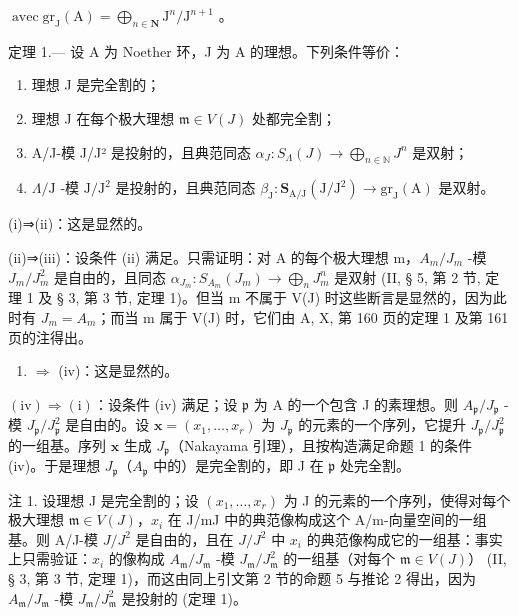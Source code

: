 \(\operatorname{avec} \mathrm{gr}_{\mathrm{J}}(\mathrm{A}) = \bigoplus_{n \in \mathbf{N}} \mathrm{J}^n / \mathrm{J}^{n+1}\) 。

定理 1.--- 设 A 为 Noether 环，J 为 A 的理想。下列条件等价：

\begin{enumerate}
\def\labelenumi{(\roman{enumi})}
\item
  理想 J 是完全割的；
\item
  理想 J 在每个极大理想 \(\mathfrak{m} \in V(J)\) 处都完全割；
\item
  A/J-模 J/J² 是投射的，且典范同态 \(\alpha_{J}: S_{\Lambda}(J) \longrightarrow \bigoplus_{n \in \mathbb{N}} J^{n}\) 是双射；
\item
  \(\Lambda/\mathrm{J}\) -模 \(\mathrm{J}/\mathrm{J}^2\) 是投射的，且典范同态 \(\beta_{\mathrm{J}}:\mathbf{S}_{\mathrm{A}/\mathrm{J}}(\mathrm{J}/\mathrm{J}^2)\longrightarrow\mathrm{gr}_{\mathrm{J}}(\mathrm{A})\) 是双射。
\end{enumerate}

(i)⇒(ii)：这是显然的。

(ii)⇒(iii)：设条件 (ii) 满足。只需证明：对 A 的每个极大理想 m，\(A_{m}/J_{m}\) -模 \(J_{m}/J_{m}^{2}\) 是自由的，且同态 \(\alpha_{J_{m}}: S_{A_{m}}(J_{m}) \longrightarrow \bigoplus_{n} J_{m}^{n}\) 是双射 (II, § 5, 第 2 节, 定理 1 及 § 3, 第 3 节, 定理 1)。但当 m 不属于 V(J) 时这些断言是显然的，因为此时有 \(J_{m} = A_{m}\)；而当 m 属于 V(J) 时，它们由 A, X, 第 160 页的定理 1 及第 161 页的注得出。

\begin{enumerate}
\def\labelenumi{(\roman{enumi})}
\setcounter{enumi}{2}
\tightlist
\item
  \(\Rightarrow\) (iv)：这是显然的。
\end{enumerate}

\((\mathrm{iv}) \Rightarrow (\mathrm{i})\)：设条件 (iv) 满足；设 \(\mathfrak{p}\) 为 A 的一个包含 J 的素理想。则 \(A_{\mathfrak{p}} / J_{\mathfrak{p}}\) -模 \(J_{\mathfrak{p}} / J_{\mathfrak{p}}^2\) 是自由的。设 \(\mathbf{x} = (x_1, \ldots, x_r)\) 为 \(J_{\mathfrak{p}}\) 的元素的一个序列，它提升 \(J_{\mathfrak{p}} / J_{\mathfrak{p}}^2\) 的一组基。序列 \(\mathbf{x}\) 生成 \(J_{\mathfrak{p}}\)（Nakayama 引理），且按构造满足命题 1 的条件 (iv)。于是理想 \(J_{\mathfrak{p}}\)（\(A_{\mathfrak{p}}\) 中的）是完全割的，即 J 在 \(\mathfrak{p}\) 处完全割。

注 1. 设理想 J 是完全割的；设 \((x_1, \ldots, x_r)\) 为 J 的元素的一个序列，使得对每个极大理想 \(\mathfrak{m} \in V(J)\)，\(x_i\) 在 J/mJ 中的典范像构成这个 A/m-向量空间的一组基。则 A/J-模 \(J/J^2\) 是自由的，且在 \(J/J^2\) 中 \(x_i\) 的典范像构成它的一组基：事实上只需验证：\(x_i\) 的像构成 \(A_{\mathfrak{m}}/J_{\mathfrak{m}}\) -模 \(J_{\mathfrak{m}}/J_{\mathfrak{m}}^2\) 的一组基（对每个 \(\mathfrak{m} \in V(J)\)） (II, § 3, 第 3 节, 定理 1)，而这由同上引文第 2 节的命题 5 与推论 2 得出，因为 \(A_{\mathfrak{m}}/J_{\mathfrak{m}}\) -模 \(J_{\mathfrak{m}}/J_{\mathfrak{m}}^2\) 是投射的 (定理 1)。

